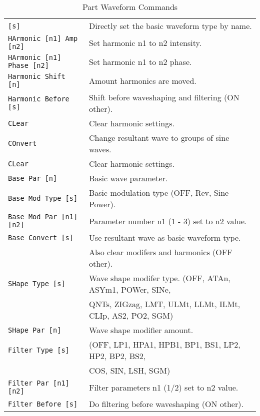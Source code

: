    \begin{table}[H]
      \centering
      \caption{Part Waveform Commands}
      \label{table:yoshimi_part_waveform_commands}
      \begin{tabular}{l l}

   \texttt{[s]} &
      Directly set the basic waveform type by name. \\
   \texttt{HArmonic [n1] Amp [n2]} &
      Set harmonic n1 to n2 intensity. \\
   \texttt{HArmonic [n1] Phase [n2]} &
      Set harmonic n1 to n2 phase. \\
   \texttt{Harmonic Shift [n]} &
      Amount harmonics are moved. \\
   \texttt{Harmonic Before [s]} &
      Shift before waveshaping and filtering (ON other). \\
   \texttt{CLear} &
      Clear harmonic settings. \\
   \texttt{COnvert} &
       Change resultant wave to groups of sine waves. \\
   \texttt{CLear} &
      Clear harmonic settings. \\
   \texttt{Base Par [n]} &
      Basic wave parameter. \\
   \texttt{Base Mod Type [s]} &
      Basic modulation type (OFF, Rev, Sine Power). \\
   \texttt{Base Mod Par [n1] [n2]} &
       Parameter number n1 (1 - 3) set to n2 value. \\
   \texttt{Base Convert [s]} &
       Use resultant wave as basic waveform type. \\
   \texttt{} &
      Also clear modifers and harmonics (OFF other). \\
   \texttt{SHape Type [s] } &
      Wave shape modifer type. (OFF, ATAn, ASYm1, POWer, SINe,\\
   \texttt{} &
       QNTs, ZIGzag, LMT, ULMt, LLMt, ILMt, CLIp, AS2, PO2, SGM) \\
   \texttt{SHape Par [n]} &
      Wave shape modifier amount. \\
   \texttt{Filter Type [s]} &
      (OFF, LP1, HPA1, HPB1, BP1, BS1, LP2, HP2, BP2, BS2, \\
      \texttt{} &
      COS, SIN, LSH, SGM)\\
   \texttt{Filter Par [n1] [n2]} &
      Filter parameters  n1 (1/2) set to n2 value. \\
   \texttt{Filter Before [s]} &
      Do filtering before waveshaping (ON other). \\

\end{tabular}
\end{table}
